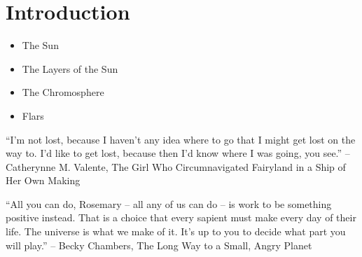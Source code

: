 \chapter{Introduction}

\begin{itemize}
    \item The Sun
    \item The Layers of the Sun
    \item The Chromosphere
    \item Flars
\end{itemize}

``I'm not lost, because I haven't any idea where to go that I might get lost on the way to. I'd like to get lost, because then I'd know where I was going, you see.''
-- Catherynne M. Valente, The Girl Who Circumnavigated Fairyland in a Ship of Her Own Making


``All you can do, Rosemary – all any of us can do – is work to be something positive instead. That is a choice that every sapient must make every day of their life. The universe is what we make of it. It’s up to you to decide what part you will play.''
-- Becky Chambers, The Long Way to a Small, Angry Planet